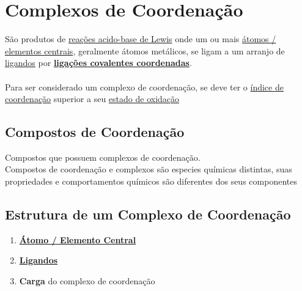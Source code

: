 \documentclass[12pt]{report}
\begin{document}
\section{Complexos de Coordenação}%
%
São produtos de \hyperlink{lewis}{reações acido-base de Lewis}  onde um ou mais \hyperlink{elemento central}{átomos / elementos centrais}, geralmente átomos metálicos, se ligam a um arranjo de \hyperlink{ligandos}{ligandos} por \hyperlink{ligacoes covalentes coordenadas}{\textbf{ligações covalentes coordenadas}}.\\\\
Para ser considerado um complexo de coordenação, se deve ter o \hyperlink{indice de coordenacao}{índice de coordenação} superior a seu \hyperlink{estadodeoxidacao}{estado de oxidação}

\hypertarget{composto de coordeancao}{}%
\subsection{Compostos de Coordenação}

Compostos que possuem complexos de coordenação.\\
Compostos de coordenação e complexos são especies químicas distintas, suas propriedades e comportamentos químicos são diferentes dos seus componentes

\subsection{Estrutura de um Complexo de Coordenação}
\begin{center}
	\huge {}
\end{center}

\renewcommand{\theenumi}{\Alph{enumi}}

\begin{enumerate}
\item 
	\hyperlink{elemento central}{\bf{Átomo / Elemento Central}}
\item \hyperlink{ligandos}{\bf{Ligandos}}
\item \textbf{Carga} do complexo de coordenação
\end{enumerate}

\end{document}
